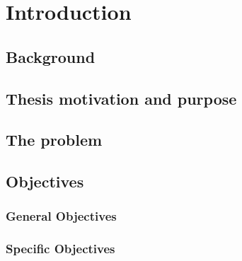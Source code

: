 \cleardoublepage
\thispagestyle{empty}
\chapter{Introduction}
\section{Background}
\label{sec:background}

\section{Thesis motivation and purpose}
\label{sec:motivation}

\section{The problem}
\label{sec:problem}

\section{Objectives}
\label{sec:objectives}

\subsection{General Objectives}
\label{sec:gobjectives}
\subsection{Specific Objectives}
\label{sec:sobjectives}

